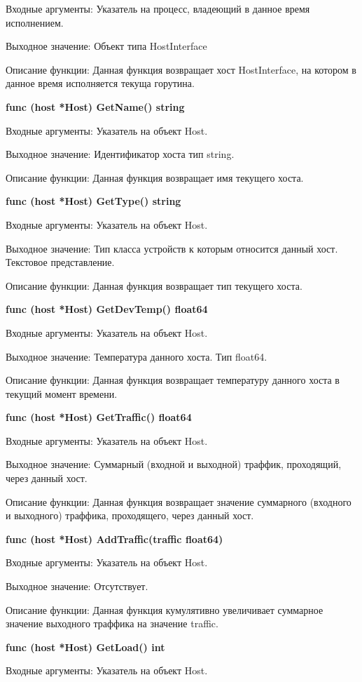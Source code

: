 Входные аргументы: Указатель на процесс, владеющий в данное время исполнением.

Выходное значение: Объект типа HostInterface

Описание функции: Данная функция возвращает хост HostInterface, на котором в данное время исполняется текуща горутина. 

\textbf{func (host *Host) GetName() string }

Входные аргументы: Указатель на объект Host.

Выходное значение: Идентификатор хоста тип string.

Описание функции: Данная функция возвращает имя текущего хоста.


\textbf{func (host *Host) GetType() string }

Входные аргументы: Указатель на объект Host.

Выходное значение: Тип класса устройств к которым относится данный хост. Текстовое представление.

Описание функции: Данная функция возвращает тип текущего хоста.


\textbf{func (host *Host) GetDevTemp() float64 }

Входные аргументы: Указатель на объект Host.

Выходное значение: Температура данного хоста. Тип float64.

Описание функции: Данная функция возвращает температуру данного хоста в текущий момент времени.


\textbf{func (host *Host) GetTraffic() float64}

Входные аргументы: Указатель на объект Host.

Выходное значение: Суммарный (входной и выходной) траффик, проходящий, через данный хост. 

Описание функции: Данная функция возвращает значение суммарного (входного и выходного) траффика, проходящего, через данный хост.


\textbf{func (host *Host) AddTraffic(traffic float64)}

Входные аргументы: Указатель на объект Host.

Выходное значение: Отсутствует.

Описание функции: Данная функция кумулятивно увеличивает суммарное значение выходного траффика на значение traffic. 


\textbf{func (host *Host) GetLoad() int }

Входные аргументы: Указатель на объект Host.

